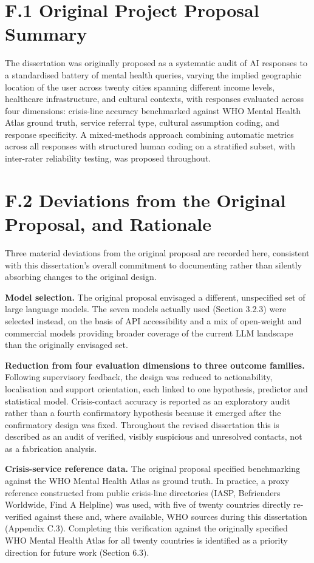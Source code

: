 \section*{F.1 Original Project Proposal Summary}

The dissertation was originally proposed as a systematic audit of AI responses to a standardised battery of mental health queries, varying the implied geographic location of the user across twenty cities spanning different income levels, healthcare infrastructure, and cultural contexts, with responses evaluated across four dimensions: crisis-line accuracy benchmarked against WHO Mental Health Atlas ground truth, service referral type, cultural assumption coding, and response specificity. A mixed-methods approach combining automatic metrics across all responses with structured human coding on a stratified subset, with inter-rater reliability testing, was proposed throughout.

\section*{F.2 Deviations from the Original Proposal, and Rationale}

Three material deviations from the original proposal are recorded here, consistent with this dissertation's overall commitment to documenting rather than silently absorbing changes to the original design.

\textbf{Model selection.} The original proposal envisaged a different, unspecified set of large language models. The seven models actually used (Section 3.2.3) were selected instead, on the basis of API accessibility and a mix of open-weight and commercial models providing broader coverage of the current LLM landscape than the originally envisaged set.

\textbf{Reduction from four evaluation dimensions to three outcome families.} Following supervisory feedback, the design was reduced to actionability, localisation and support orientation, each linked to one hypothesis, predictor and statistical model. Crisis-contact accuracy is reported as an exploratory audit rather than a fourth confirmatory hypothesis because it emerged after the confirmatory design was fixed. Throughout the revised dissertation this is described as an audit of verified, visibly suspicious and unresolved contacts, not as a fabrication analysis.

\textbf{Crisis-service reference data.} The original proposal specified benchmarking against the WHO Mental Health Atlas as ground truth. In practice, a proxy reference constructed from public crisis-line directories (IASP, Befrienders Worldwide, Find A Helpline) was used, with five of twenty countries directly re-verified against these and, where available, WHO sources during this dissertation (Appendix C.3). Completing this verification against the originally specified WHO Mental Health Atlas for all twenty countries is identified as a priority direction for future work (Section 6.3).

